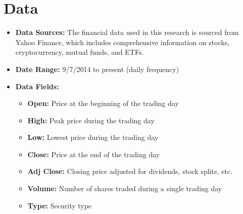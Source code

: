 \section{Data}
\begin{itemize}
    \item \textbf{Data Sources:} The financial data used in this research is sourced from Yahoo Finance, which includes comprehensive information on stocks, cryptocurrency, mutual funds, and ETFs.
    \item \textbf{Date Range:} 9/7/2014 to present (daily frequency)
    \item \textbf{Data Fields:}
    \begin{itemize}
        \item \textbf{Open:} Price at the beginning of the trading day
        \item \textbf{High:} Peak price during the trading day
        \item \textbf{Low:} Lowest price during the trading day
        \item \textbf{Close:} Price at the end of the trading day
        \item \textbf{Adj Close:} Closing price adjusted for dividends, stock splits, etc.
        \item \textbf{Volume:} Number of shares traded during a single trading day
        \item \textbf{Type:} Security type
    \end{itemize}
\end{itemize}


